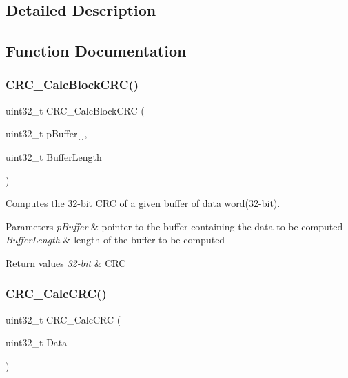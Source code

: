 \subsection{Detailed Description}


\subsection{Function Documentation}
\mbox{\label{group___c_r_c___private___functions_gab15ebf620615c360048fb4f45b15fae6}} 
\subsubsection{\texorpdfstring{CRC\_CalcBlockCRC()}{CRC\_CalcBlockCRC()}}
{\footnotesize\ttfamily uint32\+\_\+t C\+R\+C\+\_\+\+Calc\+Block\+C\+RC (\begin{DoxyParamCaption}\item[{uint32\+\_\+t}]{p\+Buffer\mbox{[}$\,$\mbox{]},  }\item[{uint32\+\_\+t}]{Buffer\+Length }\end{DoxyParamCaption})}



Computes the 32-\/bit C\+RC of a given buffer of data word(32-\/bit). 


\begin{DoxyParams}{Parameters}
{\em p\+Buffer} & pointer to the buffer containing the data to be computed \\
\hline
{\em Buffer\+Length} & length of the buffer to be computed\\
\hline
\end{DoxyParams}

\begin{DoxyRetVals}{Return values}
{\em 32-\/bit} & C\+RC \\
\hline
\end{DoxyRetVals}
\mbox{\label{group___c_r_c___private___functions_ga5407fdbb8e8c9be6322cc8856ae5db3b}} 
\subsubsection{\texorpdfstring{CRC\_CalcCRC()}{CRC\_CalcCRC()}}
{\footnotesize\ttfamily uint32\+\_\+t C\+R\+C\+\_\+\+Calc\+C\+RC (\begin{DoxyParamCaption}\item[{uint32\+\_\+t}]{Data }\end{DoxyParamCaption})}



